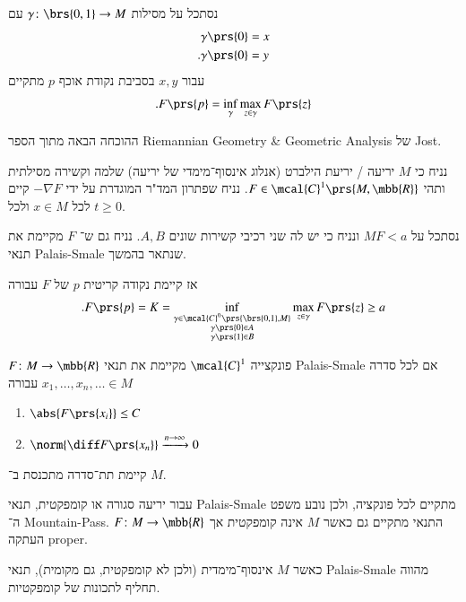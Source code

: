 \documentclass[a4paper,10pt,twoside,openany]{book}
\begin{document}
\begin{theorem}
נסתכל על מסילות
$\gamma \colon \brs{0,1} \to M$
עם
\begin{align*}
\gamma\prs{0} &= x \\
\text{.} \gamma\prs{0} &= y
\end{align*}
עבור
$x,y$
בסביבת נקודת אוכף
$p$
מתקיים
\[\text{.} F\prs{p} = \inf_\gamma \max_{z \in \gamma} F\prs{z}\]
\end{theorem}

ההוכחה הבאה מתוך הספר
\textenglish{Riemannian Geometry \& Geometric Analysis}
של
\textenglish{Jost}.

\begin{lemma}
נניח כי
$M$
יריעה / יריעת הילברט (אנלוג אינסוף־מימדי של יריעה) שלמה וקשירה מסילתית ותהי
$F \in \mcal{C}^1\prs{M,\mbb{R}}$.
נניח שפתרון המד"ר המוגדרת על ידי
$-\nabla F$
קיים לכל
$x \in M$
ולכל
$t \geq 0$.

נסתכל על
$M{F < a}$
ונניח כי יש לה שני רכיבי קשירות שונים
$A,B$.
נניח גם ש־%
$F$
מקיימת את תנאי
\textenglish{Palais-Smale}
שנתאר בהמשך.

אז קיימת נקודה קריטית
$p$
של
$F$
עבורה
\[\text{.} F\prs{p} = K = \inf_{\substack{\gamma \in \mcal{C}^0\prs{\brs{0,1}, M} \\ \gamma\prs{0} \in A \\ \gamma\prs{1} \in B}} \max_{z \in \gamma} F\prs{z} \geq a\]
\end{lemma}

\begin{definition}
$F \colon M \to \mbb{R}$
פונקצייה
$\mcal{C}^1$
מקיימת את תנאי
\textenglish{Palais-Smale}
אם לכל סדרה
$x_1, \ldots, x_n, \ldots \in M$
עבורה
\begin{enumerate}
\item $\abs{F\prs{x_i}} \leq C$
\item $\norm{\diff F\prs{x_n}} \xrightarrow{n\to\infty} 0$
\end{enumerate}
קיימת תת־סדרה מתכנסת ב־%
$M$.
\end{definition}

\begin{remark}
עבור יריעה סגורה או קומפקטית, תנאי
\textenglish{Palais-Smale}
מתקיים לכל פונקציה, ולכן נובע משפט ה־%
\textenglish{Mountain-Pass}.
התנאי מתקיים גם כאשר
$M$
אינה קומפקטית אך
$F \colon M \to \mbb{R}$
העתקה
\textenglish{proper}.

כאשר
$M$
אינסוף־מימדית (ולכן לא קומפקטית, גם מקומית), תנאי
\textenglish{Palais-Smale}
מהווה תחליף לתכונות של קומפקטיות.
\end{remark}
\end{document}
